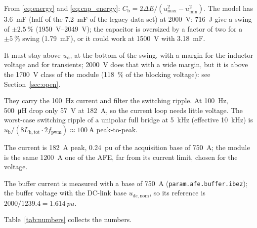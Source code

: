 \documentclass[11pt,a4paper]{scrartcl}
\newcommand{\ped}[1]{_{\mathrm{#1}}}
\newcommand{\code}[1]{\texttt{#1}}
\begin{document}
\begin{onehalfspace}
\begin{description}[nosep, leftmargin=1.5em]
	\item[Buffer capacitor.] From \eqref{eq:energy} and \eqref{eq:cap_energy}: $C\ped{b} = 2\Delta E / (u\ped{max}^2 - u\ped{min}^2)$. The model has \SI{3.6}{\milli\farad} (half of the \SI{7.2}{\milli\farad} of the legacy data set) at \SI{2000}{\volt}: \SI{716}{\joule} give a swing of $\pm\SI{2.5}{\percent}$ (\SIrange{1950}{2049}{\volt}); the capacitor is oversized by a factor of two for a $\pm\SI{5}{\percent}$ swing (\SI{1.79}{\milli\farad}), or it could work at \SI{1500}{\volt} with \SI{3.18}{\milli\farad}.
	\item[Buffer voltage.] It must stay above $u\ped{dc}$ at the bottom of the swing, with a margin for the inductor voltage and for transients; \SI{2000}{\volt} does that with a wide margin, but it is above the \SI{1700}{\volt} class of the module (\SI{118}{\percent} of the blocking voltage): see Section~\ref{sec:open}.
	\item[Inductors.] They carry the \SI{100}{\hertz} current and filter the switching ripple. At \SI{100}{\hertz}, \SI{500}{\micro\henry} drop only \SI{57}{\volt} at \SI{182}{\ampere}, so the current loop needs little voltage. The worst-case switching ripple of a unipolar full bridge at \SI{5}{\kilo\hertz} (effective \SI{10}{\kilo\hertz}) is $u\ped{b}/(8 L\ped{b,tot} \cdot 2 f\ped{pwm}) \approx \SI{100}{\ampere}$ peak-to-peak.
	\item[Bridge.] The current is \SI{182}{\ampere} peak, \SI{0.24}{pu} of the acquisition base of \SI{750}{\ampere}; the module is the same \SI{1200}{\ampere} one of the AFE, far from its current limit, chosen for the voltage.
	\item[Current base.] The buffer current is measured with a base of \SI{750}{\ampere} (\code{param.afe.buffer.ibez}); the buffer voltage with the DC-link base $u\ped{dc,nom}$, so its reference is $2000/1239.4 = \SI{1.614}{pu}$.
\end{description}

Table~\ref{tab:numbers} collects the numbers.


\end{onehalfspace}
\end{document}
